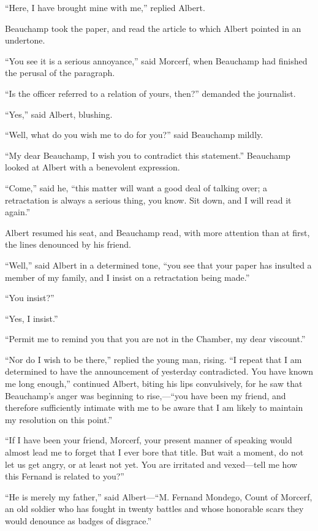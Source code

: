 “Here, I have brought mine with me,” replied Albert.

Beauchamp took the paper, and read the article to which Albert pointed
in an undertone.

“You see it is a serious annoyance,” said Morcerf, when Beauchamp had
finished the perusal of the paragraph.

“Is the officer referred to a relation of yours, then?” demanded the
journalist.

“Yes,” said Albert, blushing.

“Well, what do you wish me to do for you?” said Beauchamp mildly.

“My dear Beauchamp, I wish you to contradict this statement.” Beauchamp
looked at Albert with a benevolent expression.

“Come,” said he, “this matter will want a good deal of talking over; a
retractation is always a serious thing, you know. Sit down, and I will
read it again.”

Albert resumed his seat, and Beauchamp read, with more attention than
at first, the lines denounced by his friend.

“Well,” said Albert in a determined tone, “you see that your paper has
insulted a member of my family, and I insist on a retractation being
made.”

“You insist?”

“Yes, I insist.”

“Permit me to remind you that you are not in the Chamber, my dear
viscount.”

“Nor do I wish to be there,” replied the young man, rising. “I repeat
that I am determined to have the announcement of yesterday
contradicted. You have known me long enough,” continued Albert, biting
his lips convulsively, for he saw that Beauchamp’s anger was beginning
to rise,—“you have been my friend, and therefore sufficiently intimate
with me to be aware that I am likely to maintain my resolution on this
point.”

“If I have been your friend, Morcerf, your present manner of speaking
would almost lead me to forget that I ever bore that title. But wait a
moment, do not let us get angry, or at least not yet. You are irritated
and vexed—tell me how this Fernand is related to you?”

“He is merely my father,” said Albert—“M. Fernand Mondego, Count of
Morcerf, an old soldier who has fought in twenty battles and whose
honorable scars they would denounce as badges of disgrace.”

